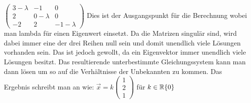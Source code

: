 \documentclass{article}
\newcommand{\R}{\mathbb{R}}
\begin{document}
	$\begin{pmatrix} 3-\lambda & -1 & 0 \\ 2 & 0-\lambda & 0 \\ -2 & 2 & -1-\lambda \end{pmatrix}$ Dies ist der Ausgangspunkt für die Berechnung wobei man lambda für einen Eigenwert einsetzt. Da die Matrizen singulär sind, wird dabei immer eine der drei Reihen null sein und domit unendlich viele Lösungen vorhanden sein. Das ist jedoch gewollt, da ein Eigenvektor immer unendlich viele Lösungen besitzt. Das resultierende unterbestimmte Gleichungssystem kann man dann lösen um so auf die Verhältnisse der Unbekannten zu kommen. Das Ergebnis schreibt man an wie: $\vec{x}=k \begin{pmatrix} 1 \\ 2 \\ 1 \end{pmatrix}$ für $k \in\R\\\{0\}$
\end{document}
